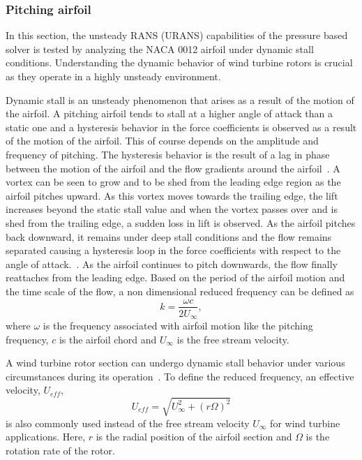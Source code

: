 \subsubsection{Pitching airfoil}
In this section, the unsteady RANS (URANS) capabilities of the pressure based solver is tested by analyzing the NACA 0012 airfoil under dynamic stall conditions. Understanding the dynamic behavior of wind turbine rotors is crucial as they operate in a highly unsteady environment. 

Dynamic stall is an unsteady phenomenon that arises as a result of the motion of the airfoil. A pitching airfoil tends to stall at a higher angle of attack than a static one and a hysteresis behavior in the force coefficients is observed as a result of the motion of the airfoil. This of course depends on the amplitude and frequency of pitching. The hysteresis behavior is the result of a lag in phase between the motion of the airfoil and the flow gradients around the airfoil~\cite{martinat2008turbulence}. A vortex can be seen to grow and to be shed from the leading edge region as the airfoil pitches upward. As this vortex moves towards the trailing edge, the lift increases beyond the static stall value and when the vortex passes over and is shed from the trailing edge, a sudden loss in lift is observed. As the airfoil pitches back downward, it remains under deep stall conditions and the flow remains separated causing a hysteresis loop in the force coefficients with respect to the angle of attack.~\cite{mcalister1978dynamic}. As the airfoil continues to pitch downwards, the flow finally reattaches from the leading edge. Based on the period of the airfoil motion and the time scale of the flow, a non dimensional reduced frequency can be defined as
\begin{equation}
k=\frac{\omega c}{2 U_{\infty}},
\end{equation}
where $\omega$ is the frequency associated with airfoil motion like the pitching frequency, $c$ is the airfoil chord and $U_{\infty}$ is the free stream velocity.

A wind turbine rotor section can undergo dynamic stall behavior under various circumstances during its operation~\cite{kim2016modelling}. To define the reduced frequency, an effective velocity, $U_{eff}$, 
\begin{equation}
U_{eff} = \sqrt{U^2_{\infty} + (r\Omega)^2}
\end{equation}
is also commonly used instead of the free stream velocity $U_{\infty}$ for wind turbine applications. Here, $r$ is the radial position of the airfoil section and $\Omega$ is the rotation rate of the rotor.

